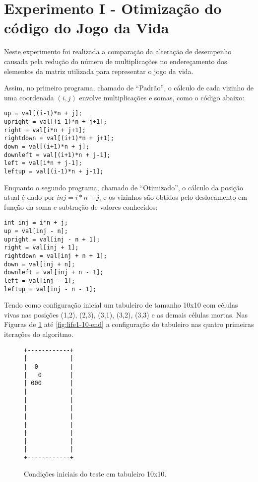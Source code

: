 \documentclass[conference]{IEEEtran}
\begin{document}
\section{Experimento I - Otimização do código do Jogo da Vida }

Neste experimento foi realizada a comparação da alteração de desempenho causada pela redução do número de multiplicações no endereçamento dos elementos da matriz utilizada para representar o jogo da vida.

Assim, no primeiro programa, chamado de ``Padrão'', o cálculo de cada vizinho de uma coordenada $(i,j)$ envolve multiplicações e somas, como o código abaixo:

\begin{lstlisting}
up = val[(i-1)*n + j];
upright = val[(i-1)*n + j+1];
right = val[i*n + j+1];
rightdown = val[(i+1)*n + j+1];
down = val[(i+1)*n + j];
downleft = val[(i+1)*n + j-1];
left = val[i*n + j-1];
leftup = val[(i-1)*n + j-1];
\end{lstlisting}

Enquanto o segundo programa, chamado de ``Otimizado'', o cálculo da posição atual é dado por $inj = i * n + j$, e os vizinhos são obtidos pelo deslocamento em função da soma e subtração de valores conhecidos:

\begin{lstlisting}
int inj = i*n + j;
up = val[inj - n];
upright = val[inj - n + 1];
right = val[inj + 1];
rightdown = val[inj + n + 1];
down = val[inj + n];
downleft = val[inj + n - 1];
left = val[inj - 1];
leftup = val[inj - n - 1];
\end{lstlisting}

Tendo como configuração inicial um tabuleiro de tamanho 10x10 com células vivas nas posições (1,2), (2,3), (3,1), (3,2), (3,3) e as demais células mortas. Nas Figuras de \ref{fig:life1-10-start} até \ref{fig:life1-10-end} a configuração do tabuleiro nas quatro primeiras iterações do algoritmo.
\begin{figure}[!htb]
\begin{verbatim}
+------------+
|            |
|  0         |
|   0        |
| 000        |
|            |
|            |
|            |
|            |
|            |
|            |
|            |
|            |
+------------+
\end{verbatim}
\caption{Condições iniciais do teste em tabuleiro 10x10.}
\label{fig:life1-10-start}
\end{figure}
\end{document}
